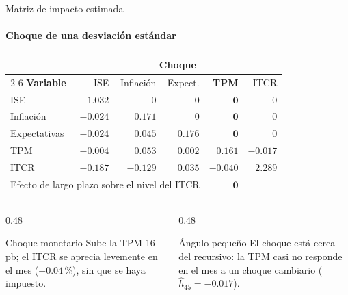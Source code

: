\documentclass{beamer}
\begin{document}
\begin{frame}{Matriz de impacto estimada}
  \framesubtitle{Choque de una desviación estándar}
  \begin{center}
  \scriptsize
  \renewcommand{\arraystretch}{1.25}
  \setlength{\tabcolsep}{5pt}
  \begin{tabular}{lrrrrr}
    \toprule
    & \multicolumn{5}{c}{\textbf{Choque}} \\
    \cmidrule(l){2-6}
    \textbf{Variable} & ISE & Inflación & Expect. & \textbf{TPM} & ITCR \\
    \midrule
    ISE          & $1.032$  & $0$      & $0$     & $\mathbf{0}$      & $0$ \\
    Inflación    & $-0.024$ & $0.171$  & $0$     & $\mathbf{0}$      & $0$ \\
    Expectativas & $-0.024$ & $0.045$  & $0.176$ & $\mathbf{0}$      & $0$ \\
    TPM          & $-0.004$ & $0.053$  & $0.002$ & $\mathbf{0.161}$  & $-0.017$ \\
    ITCR         & $-0.187$ & $-0.129$ & $0.035$ & $\mathbf{-0.040}$ & $2.289$ \\
    \midrule
    \multicolumn{4}{l}{Efecto de largo plazo sobre el nivel del ITCR} & $\mathbf{0}$ & \\
    \bottomrule
  \end{tabular}
  \end{center}
  \vfill
  \begin{columns}[T]
    \begin{column}{0.48\textwidth}
      \begin{block}{Choque monetario}
        \scriptsize Sube la TPM 16 pb; el ITCR se aprecia levemente en el mes
        ($-0.04\,\%$), sin que se haya impuesto.
      \end{block}
    \end{column}
    \begin{column}{0.48\textwidth}
      \begin{block}{Ángulo pequeño}
        \scriptsize El choque está cerca del recursivo: la TPM casi no responde
        en el mes a un choque cambiario ($\hat h_{45}=-0.017$).
      \end{block}
    \end{column}
  \end{columns}
  \vspace{0.15cm}
\end{frame}

\end{document}
